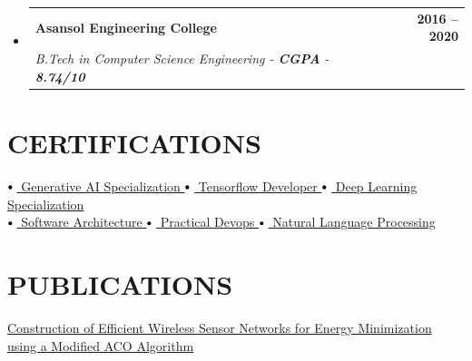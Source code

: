 \documentclass[letterpaper,10pt]{article}
\makeatletter
\newcommand{\resumeSubheading}[4]{
  \vspace{-2pt}\item
    \begin{tabular*}{1.0\textwidth}[t]{l@{\extracolsep{\fill}}r}
      \textbf{\large#1} & \textbf{\small #2} \\
      \textit{\large#3} & \textit{\small #4} \\
      
    \end{tabular*}\vspace{-7pt}
}
\newcommand{\resumeSubHeadingListStart}{\begin{itemize}[leftmargin=0.0in, label={}]}
\newcommand{\resumeSubHeadingListEnd}{\end{itemize}}
\newcommand\sbullet[1][.5]{\mathbin{\vcenter{\hbox{\scalebox{#1}{$\bullet$}}}}}
\makeatother
\begin{document}
  \resumeSubHeadingListStart

    \resumeSubheading
      {Asansol Engineering College}{2016 -- 2020}
      {B.Tech in Computer Science Engineering - \textbf{CGPA} - \textbf{8.74/10}}{}
    \resumeSubHeadingListEnd



 
\section{CERTIFICATIONS}

$\sbullet[.75] \hspace{0.1cm}${\href{https://www.coursera.org/account/accomplishments/specialization/certificate/HTW6T9JV6TWB}{ Generative AI Specialization \faExternalLink}} \hspace{1cm}
$\sbullet[.75] \hspace{0.1cm}${\href{https://www.coursera.org/account/accomplishments/specialization/certificate/VM84M4KYXB6Y}{ Tensorflow Developer \faExternalLink}} \hspace{1.1cm}
$\sbullet[.75] \hspace{0.1cm}${\href{https://www.coursera.org/account/accomplishments/specialization/certificate/8C3LD42HQ2J6}{ Deep Learning Specialization \faExternalLink}} \\
$\sbullet[.75] \hspace{0.1cm}${\href{https://www.udemy.com/certificate/UC-84855734-1563-4924-ae9a-8da1be5e8bdb/}{ Software Architecture \faExternalLink}} \hspace{2.1cm}
$\sbullet[.75] \hspace{0.1cm}${\href{https://www.udemy.com/certificate/UC-a39907b6-261c-44ec-aa44-9a58cbefebd9/}{ Practical Devops \faExternalLink}} \hspace{1.8cm}
$\sbullet[.75] \hspace{0.1cm}${\href{https://www.coursera.org/account/accomplishments/specialization/certificate/SHTEESHQQ8WR}{ Natural Language Processing \faExternalLink}} \\


\section{PUBLICATIONS}
\noindent
\href{https://doi.org/10.2174/2210327911666210120122610}{Construction of Efficient Wireless Sensor Networks for Energy Minimization using a Modified ACO Algorithm \faExternalLink} 
\end{document}
